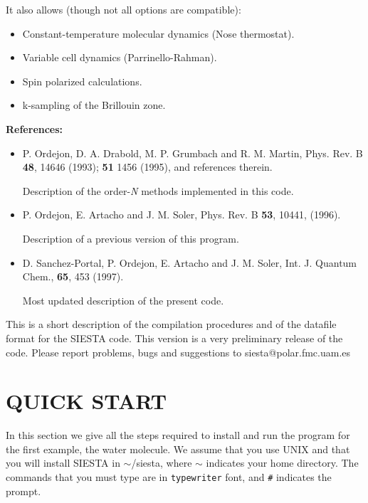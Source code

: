 It also allows (though not all options are compatible):
\begin{itemize}
\item Constant-temperature molecular dynamics (Nose thermostat).
\item Variable cell dynamics (Parrinello-Rahman).
\item Spin polarized calculations.
\item k-sampling of the Brillouin zone.
\end{itemize}

{\large {\bf References:} }

\begin{itemize}

\item
P. Ordejon, D. A. Drabold, M. P. Grumbach and R. M. Martin, 
Phys. Rev. B {\bf 48}, 14646 (1993); {\bf 51} 1456 (1995),
and references therein.

Description of the order-{\it N}
methods implemented in this code.

\item
P. Ordejon, E. Artacho and J. M. Soler,
Phys. Rev. B {\bf 53}, 10441, (1996).

Description of a previous version of this program.

\item
D. Sanchez-Portal, P. Ordejon, E. Artacho and J. M. Soler,
Int. J. Quantum Chem., {\bf 65}, 453 (1997).

Most updated description of the present code.

\end{itemize}

This is a short description of the compilation procedures
and of the datafile format for the SIESTA code.
This version is a very preliminary release of the code.
Please report problems, bugs and suggestions to
siesta@polar.fmc.uam.es



\section{QUICK START}

\noindent
In this section we give all the steps required to install
and run the program for the first example, the water molecule.
We assume that you use UNIX and that you will install SIESTA in 
$\sim$/siesta, where $\sim$ indicates your home directory.
The commands that you must type are in {\tt typewriter} font, 
and {\tt \#} indicates the prompt.

